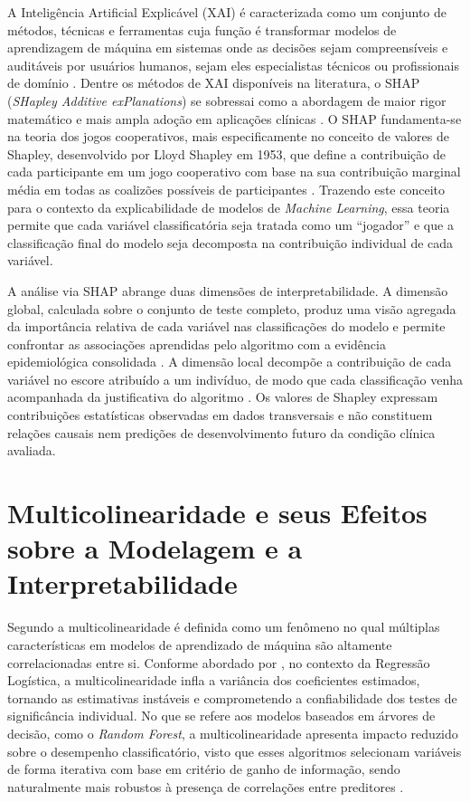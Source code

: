 A Inteligência Artificial Explicável (XAI) é caracterizada como um conjunto de métodos, técnicas e ferramentas cuja função é transformar modelos de aprendizagem de máquina em sistemas onde as decisões sejam compreensíveis e auditáveis por usuários humanos, sejam eles especialistas técnicos ou profissionais de domínio \cite{salih2025perspective}. Dentre os métodos de XAI disponíveis na literatura, o SHAP (\textit{SHapley Additive exPlanations}) se sobressai como a abordagem de maior rigor matemático e mais ampla adoção em aplicações clínicas \cite{salih2025perspective}. O SHAP fundamenta-se na teoria dos jogos cooperativos, mais especificamente no conceito de valores de Shapley, desenvolvido por Lloyd Shapley em 1953, que define a contribuição de cada participante em um jogo cooperativo com base na sua contribuição marginal média em todas as coalizões possíveis de participantes \cite{salih2025perspective}. Trazendo este conceito para o contexto da explicabilidade de modelos de \textit{Machine Learning}, essa teoria permite que cada variável classificatória seja tratada como um ``jogador'' e que a classificação final do modelo seja decomposta na contribuição individual de cada variável.

A análise via SHAP abrange duas dimensões de interpretabilidade. A dimensão global, calculada sobre o conjunto de teste completo, produz uma visão agregada da importância relativa de cada variável nas classificações do modelo e permite confrontar as associações aprendidas pelo algoritmo com a evidência epidemiológica consolidada \cite{salih2025perspective}. A dimensão local decompõe a contribuição de cada variável no escore atribuído a um indivíduo, de modo que cada classificação venha acompanhada da justificativa do algoritmo \cite{salih2025perspective}. Os valores de Shapley expressam contribuições estatísticas observadas em dados transversais e não constituem relações causais nem predições de desenvolvimento futuro da condição clínica avaliada.

\section{Multicolinearidade e seus Efeitos sobre a Modelagem e a Interpretabilidade}\label{sec:multicolinearidade}

Segundo \textcite{Salih2024} a multicolinearidade é definida como um fenômeno no qual múltiplas características em modelos de aprendizado de máquina são altamente correlacionadas entre si. Conforme abordado por \textcite{Senaviratna2019}, no contexto da Regressão Logística, a multicolinearidade infla a variância dos coeficientes estimados, tornando as estimativas instáveis e comprometendo a confiabilidade dos testes de significância individual. No que se refere aos modelos baseados em árvores de decisão, como o \textit{Random Forest}, a multicolinearidade apresenta impacto reduzido sobre o desempenho classificatório, visto que esses algoritmos selecionam variáveis de forma iterativa com base em critério de ganho de informação, sendo naturalmente mais robustos à presença de correlações entre preditores \cite{Chan2022}.

